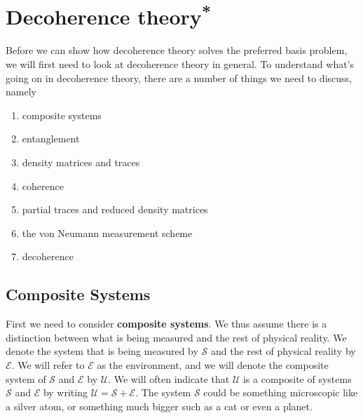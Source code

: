   
     

      
    \section{Decoherence theory\label{decotheory}\textsuperscript{*}\protect\footnotemark}
    \renewcommand{\thefootnote}{\fnsymbol{footnote}}
    \renewcommand*{\thefootnote}{\arabic{footnote}}
    Before we can show how decoherence theory solves the preferred basis problem, we will first need to look at decoherence theory in general. To understand what's going on in decoherence theory, there are a number of things we need to discuss, namely
    \begin{enumerate}[noitemsep, nosep, topsep=0pt]
    \item composite systems
    \item entanglement
    \item density matrices and traces 
    \item coherence
    \item partial traces and reduced density matrices
    \item the von Neumann measurement scheme
    \item decoherence
    \end{enumerate}
    \subsection{Composite Systems} First we need to consider \textbf{composite systems}. We thus assume there is a distinction between what is being measured and the rest of physical reality. We denote the system that is being measured by $\mathcal{S}$ and the rest of physical reality by $\mathcal{E}$. We will refer to $\mathcal{E}$ as the environment, and we will denote the composite system of $\mathcal{S}$ and $\mathcal{E}$ by $\mathcal{U}$. We will often indicate that $\mathcal{U}$ is a composite of systems $\mathcal{S}$ and $\mathcal{E}$ by writing $\mathcal{U}=\mathcal{S}+\mathcal{E}$. The system $\mathcal{S}$ could be something microscopic like a silver atom, or something much bigger such as a cat or even a planet.
    
